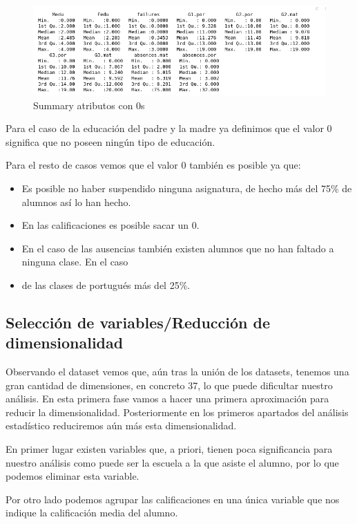 \documentclass[12pt,a4paper]{article}
\begin{document}
 \begin{figure}[ht!]
	\centering
	\includegraphics[trim = 0mm 0mm 0mm 0mm, clip,scale=0.4]{images/summary_0s}
	\caption{Summary atributos con 0s}
	\label{fig:sum_0s}
\end{figure}


Para el caso de la educación del padre y la madre ya definimos que el valor 0 significa que no poseen ningún tipo de educación.

Para el resto de casos vemos que el valor 0 también es posible ya que:

\begin{itemize}
	 

\item Es posible no haber suspendido ninguna asignatura, de hecho más del 75\% de alumnos así lo han hecho.
\item En las calificaciones es posible sacar un 0.
\item En el caso de las ausencias también existen alumnos que no han faltado a ninguna clase. En el caso \item de las clases de portugués más del 25\%.
\end{itemize}


\subsection{Selección de variables/Reducción de dimensionalidad}
Observando el dataset vemos que, aún tras la unión de los datasets, tenemos una gran cantidad de dimensiones, en concreto 37, lo que puede dificultar nuestro análisis. En esta primera fase vamos a hacer una primera aproximación para reducir la dimensionalidad. Posteriormente en los primeros apartados del análisis estadístico reduciremos aún más esta dimensionalidad.

En primer lugar existen variables que, a priori, tienen poca significancia para nuestro análisis como puede ser la escuela a la que asiste el alumno, por lo que podemos eliminar esta variable. 

Por otro lado podemos agrupar las calificaciones en una única variable que nos indique la calificación media del alumno. 
\end{document}

